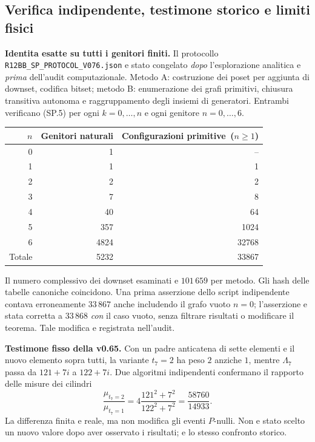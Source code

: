 \documentclass[11pt,a4paper]{article}
\begin{document}
\clearpage
\subsection*{Verifica indipendente, testimone storico e limiti fisici}
\textbf{Identita esatte su tutti i genitori finiti.} Il protocollo \texttt{R12BB\_SP\_PROTOCOL\_V076.json} e stato congelato \emph{dopo} l'esplorazione analitica e \emph{prima} dell'audit computazionale. Metodo A: costruzione dei poset per aggiunta di downset, codifica bitset; metodo B: enumerazione dei grafi primitivi, chiusura transitiva autonoma e raggruppamento degli insiemi di generatori. Entrambi verificano (SP.5) per ogni $k=0,\ldots,n$ e ogni genitore $n=0,\ldots,6$.

\begin{center}\small
\begin{tabular}{r|r|r}
$n$ & Genitori naturali & Configurazioni primitive\, ($n\ge1$)\\\hline
0 & 1 & --\\
1 & 1 & 1\\
2 & 2 & 2\\
3 & 7 & 8\\
4 & 40 & 64\\
5 & 357 & 1024\\
6 & 4824 & 32768\\\hline
Totale & 5232 & 33867
\end{tabular}
\end{center}
Il numero complessivo dei downset esaminati e $101\,659$ per metodo. Gli hash delle tabelle canoniche coincidono. Una prima asserzione dello script indipendente contava erroneamente $33\,867$ anche includendo il grafo vuoto $n=0$; l'asserzione e stata corretta a $33\,868$ \emph{con} il caso vuoto, senza filtrare risultati o modificare il teorema. Tale modifica e registrata nell'audit.

\textbf{Testimone fisso della v0.65.} Con un padre anticatena di sette elementi e il nuovo elemento sopra tutti, la variante $t_7=2$ ha peso $2$ anziche $1$, mentre $\Lambda_7$ passa da $121+7i$ a $122+7i$. Due algoritmi indipendenti confermano il rapporto delle misure dei cilindri
\begin{equation}
\boxed{\frac{\mu_{t_7=2}}{\mu_{t_7=1}}=
4\frac{121^2+7^2}{122^2+7^2}=
\frac{58760}{14933}.}\tag{SP.18}
\end{equation}
La differenza finita e reale, ma non modifica gli eventi $P$-nulli. Non e stato scelto un nuovo valore dopo aver osservato i risultati; e lo stesso confronto storico.
\end{document}

